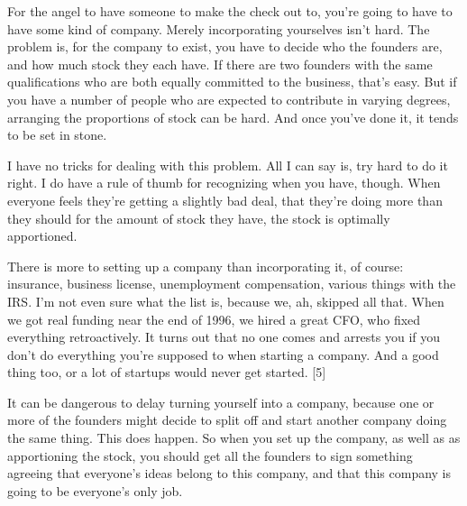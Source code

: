For the
                    angel to have someone to make the check out to, you're going
                    to have to have some kind of company. Merely incorporating
                    yourselves isn't hard. The problem is, for the company to
                    exist, you have to decide who the founders are, and how much
                    stock they each have. If there are two founders with the
                    same qualifications who are both equally committed to the
                    business, that's easy. But if you have a number of people
                    who are expected to contribute in varying degrees, arranging
                    the proportions of stock can be hard. And once you've done
                    it, it tends to be set in stone.

I have no tricks
                    for dealing with this problem. All I can say is, try hard to
                    do it right. I do have a rule of thumb for recognizing when
                    you have, though. When everyone feels they're getting a
                    slightly bad deal, that they're doing more than they should
                    for the amount of stock they have, the stock is optimally
                    apportioned.

There is more to setting up a
                    company than incorporating it, of course: insurance,
                    business license, unemployment compensation, various things
                    with the IRS. I'm not even sure what the list is, because
                    we, ah, skipped all that. When we got real funding near the
                    end of 1996, we hired a great CFO, who fixed everything
                    retroactively. It turns out that no one comes and arrests
                    you if you don't do everything you're supposed to when
                    starting a company. And a good thing too, or a lot of
                    startups would never get started. [5]

It can be
                    dangerous to delay turning yourself into a company, because
                    one or more of the founders might decide to split off and
                    start another company doing the same thing. This does
                    happen. So when you set up the company, as well as as
                    apportioning the stock, you should get all the founders to
                    sign something agreeing that everyone's ideas belong to this
                    company, and that this company is going to be everyone's
                    only job.

